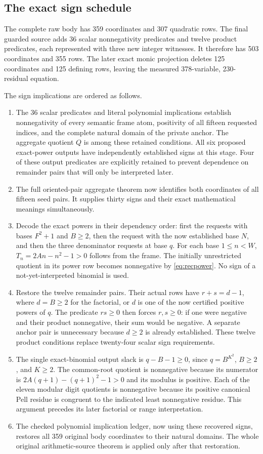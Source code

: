 \subsection{The exact sign schedule}

The complete raw body has 359 coordinates and 307 quadratic rows. The final guarded source adds 36 scalar nonnegativity predicates and twelve product predicates, each represented with three new integer witnesses. It therefore has 503 coordinates and 355 rows. The later exact monic projection deletes 125 coordinates and 125 defining rows, leaving the measured 378-variable, 230-residual equation.

The sign implications are ordered as follows.
\begin{enumerate}
\item The 36 scalar predicates and literal polynomial implications establish nonnegativity of every semantic frame atom, positivity of all fifteen requested indices, and the complete natural domain of the private anchor. The aggregate quotient $Q$ is among these retained conditions. All six proposed exact-power outputs have independently established signs at this stage. Four of these output predicates are explicitly retained to prevent dependence on remainder pairs that will only be interpreted later.
\item The full oriented-pair aggregate theorem now identifies both coordinates of all fifteen seed pairs. It supplies thirty signs and their exact mathematical meanings simultaneously.
\item Decode the exact powers in their dependency order: first the requests with bases $F^2+1$ and $B\ge2$, then the request with the now established base $N$, and then the three denominator requests at base $q$. For each base $1\le n<W$, $T_n=2An-n^2-1>0$ follows from the frame. The initially unrestricted quotient in its power row becomes nonnegative by \eqref{eq:recpower}. No sign of a not-yet-interpreted binomial is used.
\item Restore the twelve remainder pairs. Their actual rows have $r+s=d-1$, where $d=B\ge2$ for the factorial, or $d$ is one of the now certified positive powers of $q$. The predicate $rs\ge0$ then forces $r,s\ge0$: if one were negative and their product nonnegative, their sum would be negative. A separate anchor pair is unnecessary because $d\ge2$ is already established. These twelve product conditions replace twenty-four scalar sign requirements.
\item The single exact-binomial output slack is $q-B-1\ge0$, since $q=B^{K^2}$, $B\ge2$, and $K\ge2$. The common-root quotient is nonnegative because its numerator is $2A(q+1)-(q+1)^2-1>0$ and its modulus is positive. Each of the eleven modular digit quotients is nonnegative because its positive canonical Pell residue is congruent to the indicated least nonnegative residue. This argument precedes its later factorial or range interpretation.
\item The checked polynomial implication ledger, now using these recovered signs, restores all 359 original body coordinates to their natural domains. The whole original arithmetic-source theorem is applied only after that restoration.
\end{enumerate}

